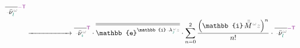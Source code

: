 \begin{subequations}
\begin{align}
\overline{\xint{\begin{smallmatrix} ~ \\ {}^{}_{\mathcolor{gray}{-}} \\ ~ \end{smallmatrix}}{15}{\bar{\nu}}^{\;\!\mathcolor{gray}{\omega}}_{\textcolor{PineGreen}{l}}}^{\textcolor{Plum}{-\mathsf{T}}} \label{eq:e^ikzz-Jordan_decompose2} \\ 
	&\xrightarrow[]{\hphantom{\xint{\mathcolor{gray}{-}}{25}{\bar{\bar{J}}}^{\;\!\mathcolor{gray}{\omega}} = \overline{\overline{\xint{\begin{smallmatrix} ~ \\ {}^{}_{\mathcolor{gray}{-}} \\ ~ \end{smallmatrix}}{22}{\lambda}^{\;\!\mathcolor{gray}{\omega}}_{\textcolor{PineGreen}{\jmath}}}} + \xint{\mathcolor{gray}{-}}{18}{\bar{\bar{M}}}^{\;\!\mathcolor{gray}{\omega}}}} \overline{\xint{\begin{smallmatrix} ~ \\ {}^{}_{\mathcolor{gray}{-}} \\ ~ \end{smallmatrix}}{15}{\bar{\nu}}^{\;\!\mathcolor{gray}{\omega}}_{\textcolor{PineGreen}{\imath}}}^{{\mathsf{\textcolor{Plum}{T}}}} \cdot \overline{\overline{\mathbb{e}^{\mathbb{i} \xint{\begin{smallmatrix} ~ \\ {}^{}_{\mathcolor{gray}{-}} \\ ~ \end{smallmatrix}}{22}{\lambda}^{\;\!\mathcolor{gray}{\omega}}_{\textcolor{PineGreen}{\jmath}} \mathcolor{gray}{z}}}} \cdot \sum^{2}_{n=0} \frac{\left( \mathbb{i} \xint{\mathcolor{gray}{-}}{18}{\bar{\bar{M}}}^{\;\!\mathcolor{gray}{\omega}} \mathcolor{gray}{z} \right)^n}{n!} \cdot \overline{\xint{\begin{smallmatrix} ~ \\ {}^{}_{\mathcolor{gray}{-}} \\ ~ \end{smallmatrix}}{15}{\bar{\nu}}^{\;\!\mathcolor{gray}{\omega}}_{\textcolor{PineGreen}{l}}}^{\textcolor{Plum}{-\mathsf{T}}} \label{eq:e^ikzz-Jordan_decompose3} \\ 

\end{align}
\end{subequations}

